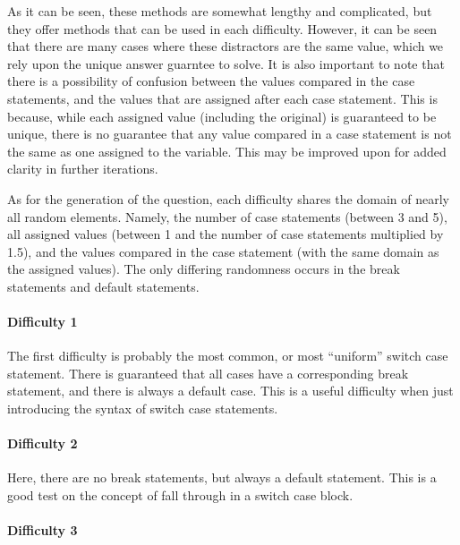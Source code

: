 \documentclass{article}
\begin{document}
As it can be seen, these methods are somewhat lengthy and complicated, but they offer methods that can be used in each difficulty. However, it can be seen that there are many cases where 
these distractors are the same value, which we rely upon the unique answer guarntee to solve. It is also important to note that there is a possibility of confusion between the values compared 
in the case statements, and the values that are assigned after each case statement. This is because, while each assigned value (including the original) is guaranteed to be unique, there is no
guarantee that any value compared in a case statement is not the same as one assigned to the variable. This may be improved upon for added clarity in further iterations. 

As for the generation of the question, each difficulty shares the domain of nearly all random elements. Namely, the number of case statements (between 3 and 5), all 
assigned values (between 1 and the number of case statements multiplied by 1.5), and the values compared in the case statement (with the same domain as the assigned values). The only 
differing randomness occurs in the break statements and default statements.

\paragraph{Difficulty 1} \hfill \par

The first difficulty is probably the most common, or most ``uniform'' switch case statement. There is guaranteed that all cases have a corresponding break statement, and there is always a
default case. This is a useful difficulty when just introducing the syntax of switch case statements.

\paragraph{Difficulty 2} \hfill \par 

Here, there are no break statements, but always a default statement. This is a good test on the concept of fall through in a switch case block.

\paragraph{Difficulty 3} \hfill \par
\end{document}
